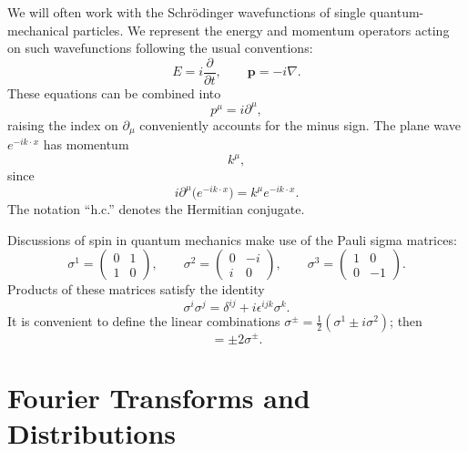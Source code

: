 We will often work with the Schr\"odinger wavefunctions of single
quantum-mechanical particles.  We represent the energy and momentum
operators acting on such wavefunctions following the usual conventions:
\begin{equation}
  E = i\frac{\partial}{\partial t},\qquad \mathbf{p} = -i\nabla .
\end{equation}
These equations can be combined into
\begin{equation}
  p^\mu = i\partial^\mu ,
\end{equation}
raising the index on $\partial_\mu$ conveniently accounts for the minus
sign.  The plane wave $e^{-ik\cdot x}$ has momentum
\begin{equation}
  k^\mu ,
\end{equation}
since
\begin{equation}
  i\partial^\mu \bigl( e^{-ik\cdot x} \bigr) = k^\mu e^{-ik\cdot x} .
\end{equation}
The notation ``h.c.'' denotes the Hermitian conjugate.

Discussions of spin in quantum mechanics make use of the Pauli sigma
matrices:
\begin{equation}
  \sigma^1 = \begin{pmatrix}0&1\\1&0\end{pmatrix},\qquad
  \sigma^2 = \begin{pmatrix}0&-i\\i&0\end{pmatrix},\qquad
  \sigma^3 = \begin{pmatrix}1&0\\0&-1\end{pmatrix}.
\end{equation}
Products of these matrices satisfy the identity
\begin{equation}
  \sigma^i \sigma^j = \delta^{ij} + i\epsilon^{ijk} \sigma^k .
\end{equation}
It is convenient to define the linear combinations
$\sigma^{\pm} = \frac{1}{2}(\sigma^1 \pm i\sigma^2)$; then
\begin{equation}
  [\sigma^3, \sigma^\pm] = \pm 2 \sigma^\pm .
\end{equation}

\section*{Fourier Transforms and Distributions}


